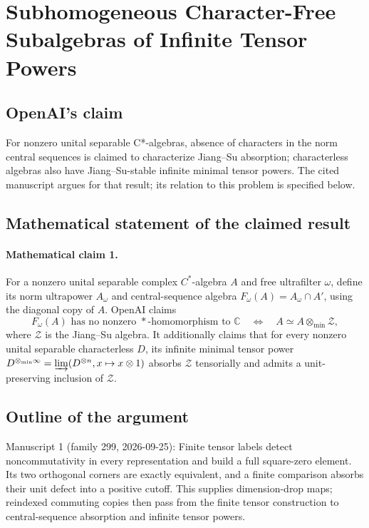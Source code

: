 \documentclass[11pt]{article}
\begin{document}
\section*{Subhomogeneous Character-Free Subalgebras of Infinite Tensor Powers}

\subsection{OpenAI's claim}
For nonzero unital separable C*-algebras, absence of characters in the norm central sequences is claimed to characterize Jiang--Su absorption; characterless algebras also have Jiang--Su-stable infinite minimal tensor powers. The cited manuscript argues for that result; its relation to this problem is specified below.

\subsection{Mathematical statement of the claimed result}
\paragraph{Mathematical claim 1.} For a nonzero unital separable complex $C^*$-algebra $A$ and free ultrafilter $\omega$, define its norm ultrapower $A_\omega$ and central-sequence algebra $F_\omega(A)=A_\omega\cap A'$, using the diagonal copy of $A$. OpenAI claims
\[
F_\omega(A)\text{ has no nonzero }*\text{-homomorphism to }\mathbb C
\quad\Longleftrightarrow\quad A\simeq A\otimes_{\min}\mathcal Z,
\]
where $\mathcal Z$ is the Jiang--Su algebra. It additionally claims that for every nonzero unital separable characterless $D$, its infinite minimal tensor power $D^{\otimes_{\min}\infty}=\varinjlim(D^{\otimes n},x\mapsto x\otimes1)$ absorbs $\mathcal Z$ tensorially and admits a unit-preserving inclusion of $\mathcal Z$.

\subsection{Outline of the argument}
Manuscript 1 (family 299, 2026-09-25): Finite tensor labels detect noncommutativity in every representation and build a full square-zero element. Its two orthogonal corners are exactly equivalent, and a finite comparison absorbs their unit defect into a positive cutoff. This supplies dimension-drop maps; reindexed commuting copies then pass from the finite tensor construction to central-sequence absorption and infinite tensor powers.
\end{document}

